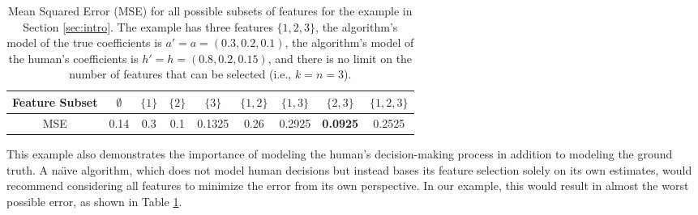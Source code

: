 \begin{table}[t]     
    \centering
    \renewcommand{\arraystretch}{1.5}
    \begin{tabular}{|c|c|c|c|c|c|c|c|c|}
        \hline
        Feature Subset          & \(\emptyset\) & \(\{1\}\) & \(\{2\}\) & \(\{3\}\) & \(\{1,2\}\) & \(\{1,3\}\) & \(\{2,3\}\) & \(\{1,2,3\}\) \\ \hline
        MSE             & 0.14         & 0.3       & 0.1       & 0.1325      & 0.26        & 0.2925        & \textbf{0.0925}        & 0.2525         \\ \hline
    \end{tabular}
        \caption{\normalfont Mean Squared Error (MSE) for all possible subsets of features  for the example in Section \ref{sec:intro}. The example has three features $\{1,2,3\}$, the algorithm's model of the true coefficients is $a'=a=(0.3, 0.2, 0.1)$, the algorithm's model of the human's coefficients is $h'=h=(0.8, 0.2, 0.15)$, and there is no limit on the number of features that can be selected (i.e., $k=n=3$). }
        \label{tbl:example-mse}
\end{table}




This example also demonstrates the importance of modeling the human's decision-making process in addition to modeling the ground truth. A na\"{\i}ve algorithm, which does not model human decisions but instead bases its feature selection solely on its own estimates, 
would recommend considering all features to minimize the error from its own perspective.  
In our example, this would result in almost the worst possible error, as shown in Table \ref{tbl:example-mse}.  


